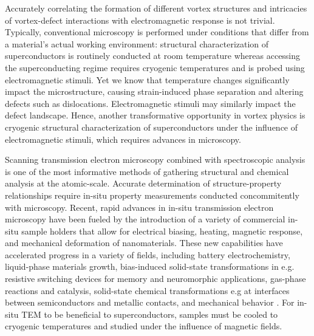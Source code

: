 \documentclass[%
 aip,
 amsmath,amssymb,
 reprint,%
floatfix]{revtex4-1}
\begin{document}
Accurately correlating the formation of different vortex structures and intricacies of vortex-defect interactions with electromagnetic response is not trivial. Typically, conventional microscopy is performed under conditions that differ from a material's actual working environment: structural characterization of superconductors is routinely conducted at room temperature whereas accessing the superconducting regime requires cryogenic temperatures and is probed using electromagnetic stimuli. Yet we know that temperature changes significantly impact the microstructure, causing strain-induced phase separation and altering defects such as dislocations.  Electromagnetic stimuli may similarly impact the defect landscape.  Hence, another transformative opportunity in vortex physics is cryogenic structural characterization of superconductors under the influence of electromagnetic stimuli, which requires advances in microscopy.



Scanning transmission electron microscopy combined with spectroscopic analysis is one of the most informative methods of gathering structural and chemical analysis at the atomic-scale.  Accurate determination of structure-property relationships require in-situ property measurements conducted concommitently with microscopy. Recent, rapid advances in in-situ transmission electron microscopy have been fueled by the introduction of a variety of commercial in-situ sample holders that allow for electrical biasing, heating, magnetic response, and mechanical deformation of nanomaterials\cite{McDowell2018}. These new capabilities have accelerated progress in a variety of fields, including battery electrochemistry, liquid-phase materials growth, bias-induced solid-state transformations in e.g. resistive switching devices for memory and neuromorphic applications, gas-phase reactions and catalysis, solid-state chemical transformations e.g at interfaces between semiconductors and metallic contacts, and mechanical behavior \cite{McDowell2018}.  For in-situ TEM to be beneficial to superconductors, samples must be cooled to cryogenic temperatures and studied under the influence of magnetic fields.
\end{document}
